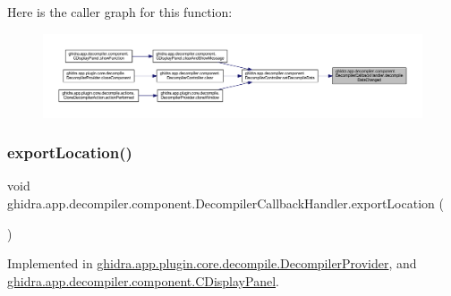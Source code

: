 Here is the caller graph for this function\+:
\nopagebreak
\begin{figure}[H]
\begin{center}
\leavevmode
\includegraphics[width=350pt]{interfaceghidra_1_1app_1_1decompiler_1_1component_1_1_decompiler_callback_handler_a317fd8c2d45cf2bef9ab0e15f4f7ed30_icgraph}
\end{center}
\end{figure}
\mbox{\label{interfaceghidra_1_1app_1_1decompiler_1_1component_1_1_decompiler_callback_handler_a94124bad6258c05b2de2fd1e9c7069b1}} 
\subsubsection{\texorpdfstring{exportLocation()}{exportLocation()}}
{\footnotesize\ttfamily void ghidra.\+app.\+decompiler.\+component.\+Decompiler\+Callback\+Handler.\+export\+Location (\begin{DoxyParamCaption}{ }\end{DoxyParamCaption})}



Implemented in \mbox{\hyperlink{classghidra_1_1app_1_1plugin_1_1core_1_1decompile_1_1_decompiler_provider_a2814de1704038c1314a058a368640044}{ghidra.\+app.\+plugin.\+core.\+decompile.\+Decompiler\+Provider}}, and \mbox{\hyperlink{classghidra_1_1app_1_1decompiler_1_1component_1_1_c_display_panel_a68f0f8269debc8cc3aa8dd048dc42785}{ghidra.\+app.\+decompiler.\+component.\+C\+Display\+Panel}}.

